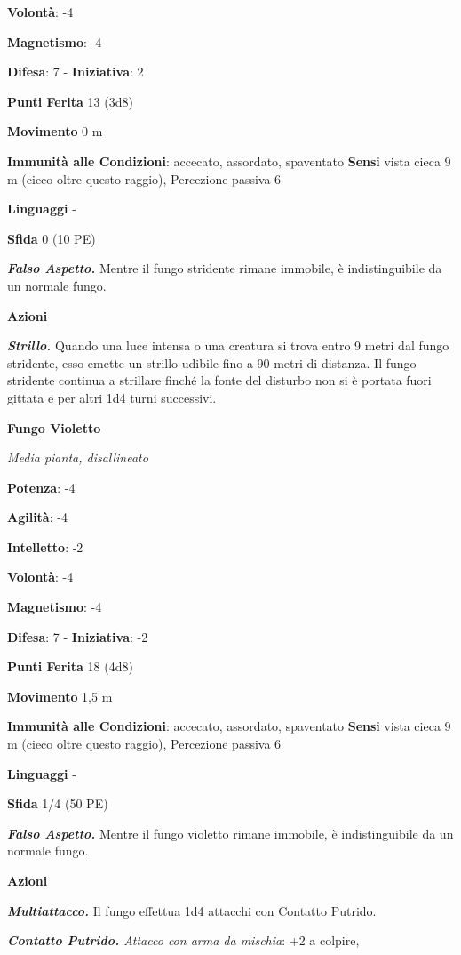 \begin{multicols}{2}
\textbf{Volontà}: -4

\textbf{Magnetismo}: -4

\textbf{Difesa}: 7 - \textbf{Iniziativa}: 2

\textbf{Punti Ferita} 13 (3d8)

\textbf{Movimento} 0 m

\textbf{Immunità alle Condizioni}: accecato, assordato, spaventato
\textbf{Sensi} vista cieca 9 m (cieco oltre questo raggio), Percezione
passiva 6

\textbf{Linguaggi} -

\textbf{Sfida} 0 (10 PE)\smallskip

\emph{\textbf{Falso Aspetto.}} Mentre il fungo stridente rimane
immobile, è indistinguibile da un normale fungo.

\smallskip\textbf{Azioni}

\emph{\textbf{Strillo.}} Quando una luce intensa o una creatura si trova
entro 9 metri dal fungo stridente, esso emette un strillo udibile fino a
90 metri di distanza. Il fungo stridente continua a strillare finché la
fonte del disturbo non si è portata fuori gittata e per altri 1d4 turni
successivi.

\textbf{Fungo Violetto}

\emph{Media pianta, disallineato}

\textbf{Potenza}: -4

\textbf{Agilità}: -4

\textbf{Intelletto}: -2

\textbf{Volontà}: -4

\textbf{Magnetismo}: -4

\textbf{Difesa}: 7 - \textbf{Iniziativa}: -2

\textbf{Punti Ferita} 18 (4d8)

\textbf{Movimento} 1,5 m

\textbf{Immunità alle Condizioni}: accecato, assordato, spaventato
\textbf{Sensi} vista cieca 9 m (cieco oltre questo raggio), Percezione
passiva 6

\textbf{Linguaggi} -

\textbf{Sfida} 1/4 (50 PE)\smallskip

\emph{\textbf{Falso Aspetto.}} Mentre il fungo violetto rimane immobile,
è indistinguibile da un normale fungo.

\smallskip\textbf{Azioni}

\emph{\textbf{Multiattacco.}} Il fungo effettua 1d4 attacchi con
Contatto Putrido.

\emph{\textbf{Contatto Putrido.} Attacco con arma da mischia}: +2 a
colpire,


\end{multicols}
